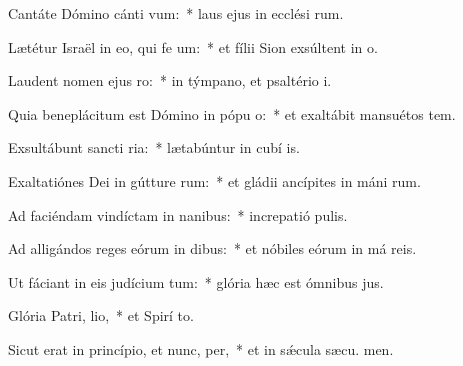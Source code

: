 \item Cantáte Dómino cánti vum:~* laus ejus in ecclési rum.
\item Lætétur Israël in eo, qui fe um:~* et fílii Sion exsúltent in  o.
\item Laudent nomen ejus  ro:~* in týmpano, et psaltério  i.
\item Quia beneplácitum est Dómino in pópu o:~* et exaltábit mansuétos  tem.
\item Exsultábunt sancti  ria:~* lætabúntur in cubí is.
\item Exaltatiónes Dei in gútture rum:~* et gládii ancípites in máni rum.
\item Ad faciéndam vindíctam in nanibus:~* increpatió  pulis.
\item Ad alligándos reges eórum in dibus:~* et nóbiles eórum in má reis.
\item Ut fáciant in eis judícium tum:~* glória hæc est ómnibus  jus.
\item Glória Patri,  lio,~* et Spirí to.
\item Sicut erat in princípio, et nunc,  per,~* et in sǽcula sæcu. men.
